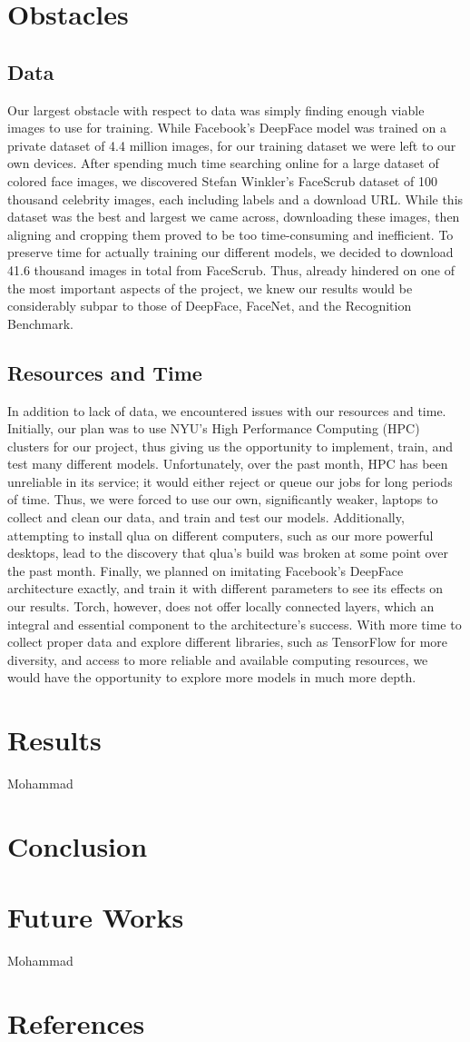 \documentclass[11pt]{article}
\begin{document}
\section{Obstacles}
    \subsection{Data}
	\par
	Our largest obstacle with respect to data was simply finding enough viable images to use for training. While Facebook's DeepFace model was trained on a private dataset of 4.4 million images, for our training dataset we were left to our own devices. After spending much time searching online for a large dataset of colored face images, we discovered Stefan Winkler's FaceScrub dataset of 100 thousand celebrity images, each including labels and a download URL. While this dataset was the best and largest we came across, downloading these images, then aligning and cropping them proved to be too time-consuming and inefficient. To preserve time for actually training our different models, we decided to download 41.6 thousand images in total from FaceScrub. Thus, already hindered on one of the most important aspects of the project, we knew our results would be considerably subpar to those of DeepFace, FaceNet, and the Recognition Benchmark.  
    \subsection{Resources and Time}
	\par
	In addition to lack of data, we encountered issues with our resources and time. Initially, our plan was to use NYU's High Performance Computing (HPC) clusters for our project, thus giving us the opportunity to implement, train, and test many different models. Unfortunately, over the past month, HPC has been unreliable in its service; it would either reject or queue our jobs for long periods of time. Thus, we were forced to use our own, significantly weaker, laptops to collect and clean our data, and train and test our models. Additionally, attempting to install qlua on different computers, such as our more powerful desktops, lead to the discovery that qlua's build was  broken at some point over the past month. Finally, we planned on imitating Facebook's DeepFace architecture exactly, and train it with different parameters to see its effects on our results. Torch, however, does not offer locally connected layers, which an integral and essential component to the architecture's success. With more time to collect proper data and explore different libraries, such as TensorFlow for more diversity, and access to more reliable and available computing resources, we would have the opportunity to explore more models in much more depth. 
\section{Results} Mohammad
\section{Conclusion}
    \par
    
\section{Future Works} Mohammad
\section{References}
\end{document}
